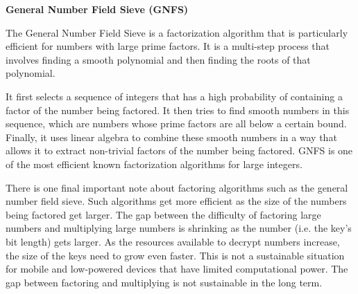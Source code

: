 \documentclass{article}
\begin{document}



\begin{center}
\textbf{General Number Field Sieve (GNFS)}
\end{center}

The General Number Field Sieve is a factorization algorithm that is particularly efficient for numbers with large prime factors. It is a multi-step process that involves finding a smooth polynomial and then finding the roots of that polynomial.

\vspace{2mm}
It first selects a sequence of integers that has a high probability of containing a factor of the number being factored. It then tries to find smooth numbers in this sequence, which are numbers whose prime factors are all below a certain bound. Finally, it uses linear algebra to combine these smooth numbers in a way that allows it to extract non-trivial factors of the number being factored. GNFS is one of the most efficient known factorization algorithms for large integers.

\vspace{2mm}
There is one final important note about factoring algorithms such as the general number field sieve. Such algorithms get more efficient as the size of the numbers being factored get larger. The gap between the difficulty of factoring large numbers and multiplying large numbers is shrinking as the number (i.e. the key's bit length) gets larger. As the resources available to decrypt numbers increase, the size of the keys need to grow even faster. This is not a sustainable situation for mobile and low-powered devices that have limited computational power. The gap between factoring and multiplying is not sustainable in the long term.
\end{document}
